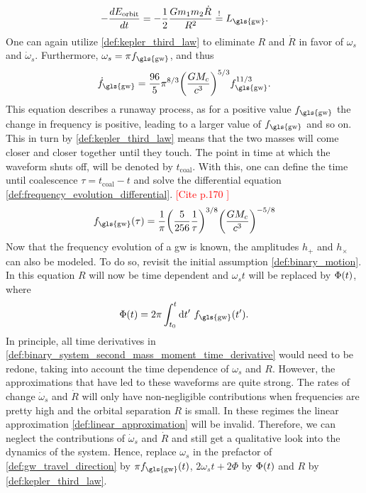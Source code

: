 \begin{equation}
-\frac{d E_\text{orbit}}{dt}=-\frac{1}{2}\frac{G m_1 m_2 \dot{R}}{R^2}\mbe L_\text{\gls{gw}}.
\end{equation}
One can again utilize \eqref{def:kepler_third_law} to eliminate $R$ and $\dot{R}$ in favor of $\omega_s$ and $\dot{\omega}_s$. Furthermore, $\omega_s = \pi f_\text{\gls{gw}}$, and thus
\begin{equation}\label{def:frequency_evolution_differential}
\dot{f}_\text{\gls{gw}}=\frac{96}{5}\pi^{8/3}\lr{\frac{G M_c}{c^3}}^{5/3}f_\text{\gls{gw}}^{11/3}.
\end{equation}
This equation describes a runaway process, as for a positive value $f_\text{\gls{gw}}$ the change in frequency is positive, leading to a larger value of $f_\text{\gls{gw}}$ and so on. This in turn by \eqref{def:kepler_third_law} means that the two masses will come closer and closer together until they touch. The point in time at which the waveform shuts off, will be denoted by $t_\text{coal}$. With this, one can define the time until coalescence $\tau=t_\text{coal}-t$ and solve the differential equation \eqref{def:frequency_evolution_differential}. \textcolor{red}{[Cite p.170 \cite{gwv1}]}
\begin{equation}\label{def:frequency evolution}
f_\text{\gls{gw}}\lr{\tau} = \frac{1}{\pi}\lr{\frac{5}{256}\frac{1}{\tau}}^{3/8}\lr{\frac{G M_c}{c^3}}^{-5/8}
\end{equation}
Now that the frequency evolution of a \gls{gw} is known, the amplitudes $h_+$ and $h_\times$ can also be modeled. To do so, revisit the initial assumption \eqref{def:binary_motion}. In this equation $R$ will now be time dependent and $\omega_s t$ will be replaced by $\Phi{\left( t \right)}$, where
\begin{equation}\label{def:phase_equation}
\Phi\lr{t} = 2\pi \int_{t_0}^t\diff t'\ f_\text{\gls{gw}}\lr{t'}.
\end{equation}
In principle, all time derivatives in \eqref{def:binary_system_second_mass_moment_time_derivative} would need to be redone, taking into account the time dependence of $\omega_s$ and $R$. However, the approximations that have led to these waveforms are quite strong. The rates of change $\dot{\omega}_s$ and $\dot{R}$ will only have non-negligible contributions when frequencies are pretty high and the orbital separation $R$ is small. In these regimes the linear approximation \eqref{def:linear_approximation} will be invalid. Therefore, we can neglect the contributions of $\dot{\omega}_s$ and $\dot{R}$ and still get a qualitative look into the dynamics of the system. Hence, replace $\omega_s$ in the prefactor of \eqref{def:gw_travel_direction} by $\pi f_\text{\gls{gw}}\lr{t}$, $2\omega_s t + 2 \Phi$ by $\Phi{\left( t \right)}$ and $R$ by \eqref{def:kepler_third_law}.\\
